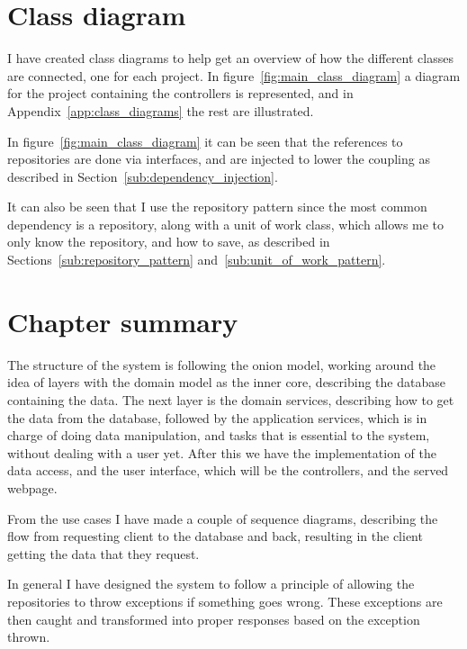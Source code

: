 \section{Class diagram}
\label{sec:class_diagram}

I have created class diagrams to help get an overview of how the different
classes are connected, one for each project. In
figure~\ref{fig:main_class_diagram} a diagram for the project containing the
controllers is represented, and in Appendix~\ref{app:class_diagrams} the rest
are illustrated.

In figure~\ref{fig:main_class_diagram} it can be seen that the references to
repositories are done via interfaces, and are injected to lower the coupling
as described in Section~\ref{sub:dependency_injection}.

It can also be seen that I use the repository pattern since the most common
dependency is a repository, along with a unit of work class, which allows me to
only know the repository, and how to save, as described in
Sections~\ref{sub:repository_pattern} and~\ref{sub:unit_of_work_pattern}.


\section{Chapter summary}
The structure of the system is following the onion model, working around the
idea of layers with the domain model as the inner core, describing the database
containing the data. The next layer is the domain services, describing how to
get the data from the database, followed by the application services, which is
in charge of doing data manipulation, and tasks that is essential to the system,
without dealing with a user yet. After this we have the implementation of the
data access, and the user interface, which will be the controllers, and the
served webpage.

From the use cases I have made a couple of sequence diagrams, describing the flow
from requesting client to the database and back, resulting in the client
getting the data that they request. 

In general I have designed the system to follow a principle of allowing the
repositories to throw exceptions if something goes wrong. These exceptions are
then caught and transformed into proper responses based on the exception thrown.

